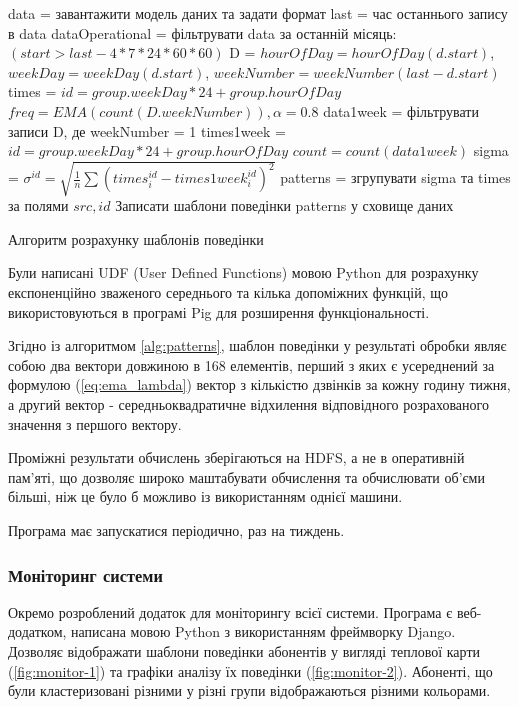 \begin{algorithm}[h!]
data = завантажити модель даних та задати формат\;
last = час останнього запису в data\;
dataOperational = фільтрувати data за останній місяць: $(start > last - 4*7*24*60*60)$\;
D =  {
  $hourOfDay = hourOfDay(d.start)$, $weekDay = weekDay(d.start)$, $weekNumber = weekNumber(last - d.start)$\;
}
times =  {
  $id = group.weekDay*24+group.hourOfDay$\;
  $freq = EMA(count(D.weekNumber)), \alpha = 0.8$\;
}
data1week = фільтрувати записи D, де weekNumber = 1\;
times1week =  {
  $id = group.weekDay*24+group.hourOfDay$\;
  $count = count(data1week)$\;
}
sigma =  {
  $\sigma^{id} = \sqrt{\frac{1}{n} \sum{({times}^{id}_i - {times1week}^{id}_i)^2}}$\;
}
patterns = згрупувати sigma та times за полями $src, id$\;
Записати шаблони поведінки patterns у сховище даних\;
\caption{Алгоритм розрахунку шаблонів поведінки}
\label{alg:patterns}
\end{algorithm}

Були написані UDF (User Defined Functions) мовою Python для розрахунку експоненційно зваженого середнього та кілька допоміжних функцій, що використовуються в програмі Pig для розширення функціональності.

Згідно із алгоритмом \ref{alg:patterns}, шаблон поведінки у результаті обробки являє собою два вектори довжиною в 168 елементів, перший з яких є усереднений за формулою (\ref{eq:ema_lambda}) вектор з кількістю дзвінків за кожну годину тижня, а другий вектор - середньоквадратичне відхилення відповідного розрахованого значення з першого вектору.

Проміжні результати обчислень зберігаються на HDFS, а не в оперативній пам'яті, що дозволяє широко маштабувати обчислення та обчислювати об'єми більші, ніж це було б можливо із використанням однієї машини.

Програма має запускатися періодично, раз на тиждень.

\subsubsection{Моніторинг системи}

Окремо розроблений додаток для моніторингу всієї системи. Програма є веб-додатком, написана мовою Python з використанням фреймворку Django. Дозволяє відображати шаблони поведінки абонентів у вигляді теплової карти (\autoref{fig:monitor-1}) та графіки аналізу їх поведінки (\autoref{fig:monitor-2}). Абоненті, що були кластеризовані різними у різні групи відображаються різними кольорами.


